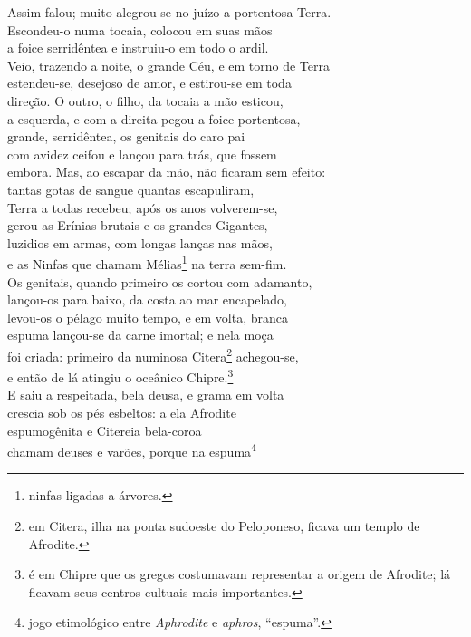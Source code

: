 \quad{}Assim falou; muito alegrou-se no juízo a portentosa Terra.\\
Escondeu-o numa tocaia, colocou em suas mãos\\
a foice serridêntea e instruiu-o em todo o ardil. \\
Veio, trazendo a noite, o grande Céu, e em torno de Terra\\
estendeu-se, desejoso de amor, e estirou-se em toda\\
direção. O outro, o filho, da tocaia a mão esticou,\\
a esquerda, e com a direita pegou a foice portentosa,\\
grande, serridêntea, os genitais do caro pai \\
com avidez ceifou e lançou para trás, que fossem\\
embora. Mas, ao escapar da mão, não ficaram sem efeito:\\
tantas gotas de sangue quantas escapuliram,\\
Terra a todas recebeu; após os anos volverem-se,\\
gerou as Erínias brutais e os grandes Gigantes, \\
luzidios em armas, com longas lanças nas mãos,\\
e as Ninfas que chamam Mélias\footnote{ninfas ligadas a árvores.} na terra sem-fim.\\
Os genitais, quando primeiro os cortou com adamanto,\\
lançou-os para baixo, da costa ao mar encapelado,\\
levou-os o pélago muito tempo, e em volta, branca \\
espuma lançou-se da carne imortal; e nela moça\\
foi criada: primeiro da numinosa Citera\footnote{em Citera, ilha na ponta sudoeste do Peloponeso, ficava um templo de Afrodite.} achegou-se,\\
e então de lá atingiu o oceânico Chipre.\footnote{é em Chipre que os gregos costumavam representar a origem de Afrodite; lá ficavam seus centros cultuais mais importantes.}\\
E saiu a respeitada, bela deusa, e grama em volta\\
crescia sob os pés esbeltos: a ela Afrodite \\
espumogênita e Citereia bela-coroa\\
chamam deuses e varões, porque na espuma\footnote{jogo etimológico entre \emph{Aphrodite} e \emph{aphros}, ``espuma''.}\\
